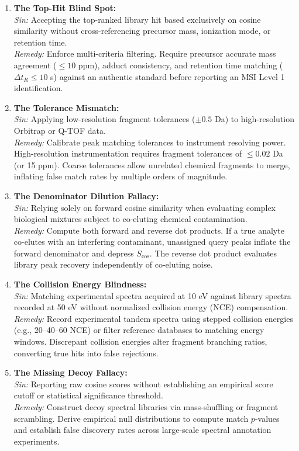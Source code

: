 \documentclass[11pt,twoside,openright]{book}
\begin{document}
\begin{enumerate}
    \item \textbf{The Top-Hit Blind Spot:}\\
    \textit{Sin:} Accepting the top-ranked library hit based exclusively on cosine similarity without cross-referencing precursor mass, ionization mode, or retention time.\\
    \textit{Remedy:} Enforce multi-criteria filtering. Require precursor accurate mass agreement ($\le 10$ ppm), adduct consistency, and retention time matching ($\Delta t_R \le 10$ s) against an authentic standard before reporting an MSI Level 1 identification.

    \item \textbf{The Tolerance Mismatch:}\\
    \textit{Sin:} Applying low-resolution fragment tolerances ($\pm 0.5$ Da) to high-resolution Orbitrap or Q-TOF data.\\
    \textit{Remedy:} Calibrate peak matching tolerances to instrument resolving power. High-resolution instrumentation requires fragment tolerances of $\le 0.02$ Da (or 15 ppm). Coarse tolerances allow unrelated chemical fragments to merge, inflating false match rates by multiple orders of magnitude.

    \item \textbf{The Denominator Dilution Fallacy:}\\
    \textit{Sin:} Relying solely on forward cosine similarity when evaluating complex biological mixtures subject to co-eluting chemical contamination.\\
    \textit{Remedy:} Compute both forward and reverse dot products. If a true analyte co-elutes with an interfering contaminant, unassigned query peaks inflate the forward denominator and depress $S_{\cos}$. The reverse dot product evaluates library peak recovery independently of co-eluting noise.

    \item \textbf{The Collision Energy Blindness:}\\
    \textit{Sin:} Matching experimental spectra acquired at 10 eV against library spectra recorded at 50 eV without normalized collision energy (NCE) compensation.\\
    \textit{Remedy:} Record experimental tandem spectra using stepped collision energies (e.g., 20--40--60 NCE) or filter reference databases to matching energy windows. Discrepant collision energies alter fragment branching ratios, converting true hits into false rejections.

    \item \textbf{The Missing Decoy Fallacy:}\\
    \textit{Sin:} Reporting raw cosine scores without establishing an empirical score cutoff or statistical significance threshold.\\
    \textit{Remedy:} Construct decoy spectral libraries via mass-shuffling or fragment scrambling. Derive empirical null distributions to compute match $p$-values and establish false discovery rates across large-scale spectral annotation experiments.
\end{enumerate}
\end{document}
